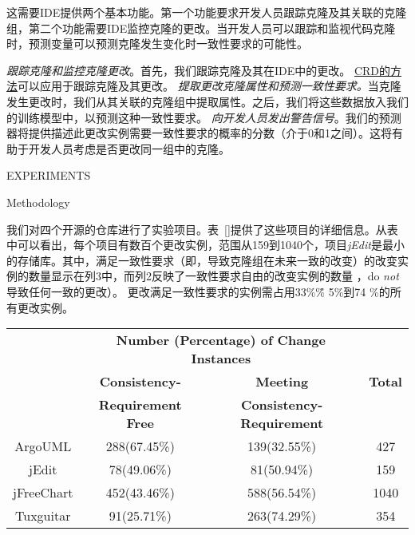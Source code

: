 这需要IDE提供两个基本功能。第一个功能要求开发人员跟踪克隆及其关联的克隆组，第二个功能需要IDE监控克隆的更改。当开发人员可以跟踪和监视代码克隆时，预测变量可以预测克隆发生变化时一致性要求的可能性。 {\emph {跟踪克隆和监控克隆更改}。首先，我们跟踪克隆及其在IDE中的更改。 \underline {CRD的方法}可以应用于跟踪克隆及其更改。 \emph {提取更改克隆属性和预测一致性要求。}当克隆发生更改时，我们从其关联的克隆组中提取属性。之后，我们将这些数据放入我们的训练模型中，以预测这种一致性要求。 \emph {向开发人员发出警告信号}。我们的预测器将提供描述此更改实例需要一致性要求的概率的分数（介于0和1之间）。这将有助于开发人员考虑是否更改同一组中的克隆。

{EXPERIMENTS}

{Methodology}

我们对四个开源的仓库进行了实验项目。表~\ref {}提供了这些项目的详细信息。从表中可以看出，每个项目有数百个更改实例，范围从159到1040个，项目{\em  jEdit}是最小的存储库。其中，满足一致性要求（即，导致克隆组在未来一致的改变）的改变实例的数量显示在列3中，而列2反映了一致性要求自由的改变实例的数量 ，do {\em not }导致任何一致的更改）。
更改满足一致性要求的实例需占用33\%\~\% 5\%到74 \%的所有更改实例。

\begin{table}[htbp]
\vspace{0.5em}\centering\wuhao
\begin{tabular}{cccc}
\toprule[1.5pt]
~\multirow{3}{*}{\textbf{Project}}& \multicolumn{2}{c}{\textbf{Number (Percentage) of Change Instances}} & \multirow{3}{*}{\textbf{Total}}\\ 
 \cline{2-3}
 ~& \textbf{Consistency-} &\textbf{Meeting} & ~\\
 &\textbf{Requirement Free}&\textbf{Consistency-Requirement}&\\
\midrule[1pt]
ArgoUML&288(67.45\%)&139(32.55\%)&427\\
jEdit&78(49.06\%)&81(50.94\%)&159\\
jFreeChart&452(43.46\%)&588(56.54\%)&1040\\
Tuxguitar&91(25.71\%)&263(74.29\%)&354\\
\bottomrule[1.5pt]
\end{tabular}
\end{table}


}
